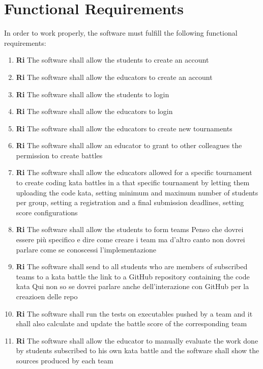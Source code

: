 {\color{red} \section{Functional Requirements}}
In order to work properly, the software must fulfill the following functional requirements:
    \begin{enumerate}
        \item \textbf{Ri} \quad The software shall allow the students to create an account
        \item \textbf{Ri} \quad The software shall allow the educators to create an account 
        \item \textbf{Ri} \quad The software shall allow the students to login
        \item \textbf{Ri} \quad The software shall allow the educators to login
        \item \textbf{Ri} \quad The software shall allow the educators to create new tournaments
        \item \textbf{Ri} \quad The software shall allow an educator to grant to other colleagues the permission to create battles
        \item \textbf{Ri} \quad The software shall allow the educators allowed for a specific tournament to create coding kata battles in a that specific tournament by letting them uploading the code kata, setting minimum and maximum number of students per group, setting a registration and a final submission deadlines, setting score configurations
        \item \textbf{Ri} \quad The software shall allow the students to form teams {\color{red} Penso che dovrei essere più specifico e dire come creare i team ma d'altro canto non dovrei parlare come se conoscessi l'implementazione}
        \item \textbf{Ri} \quad The software shall send to all students who are members of subscribed teams to a kata battle the link to a GitHub repository containing the code kata {\color{red} Qui non so se dovrei parlare anche dell'interazione con GitHub per la creazioen delle repo}
        \item \textbf{Ri} \quad The software shall run the tests on executables pushed by a team and it shall also calculate and update the battle score of the corresponding team 
        \item \textbf{Ri} \quad The software shall allow the educator to manually evaluate the work done by students subscribed to his own kata battle and the software shall show the sources produced by each team

\end{enumerate}
